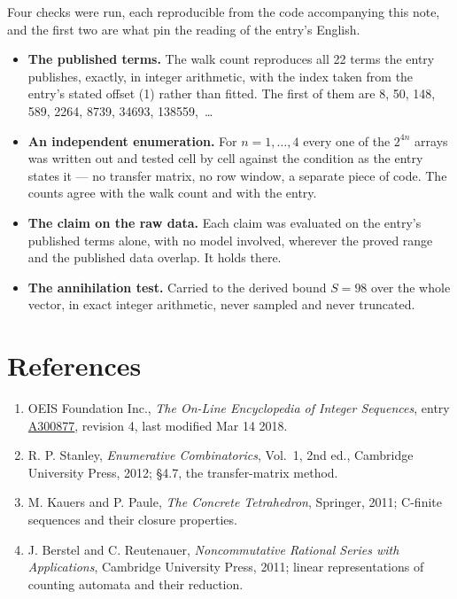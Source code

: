 \documentclass[11pt]{article}
\theoremstyle{definition}
\begin{document}
Four checks were run, each reproducible from the code accompanying this note, and the first two are what pin the reading of the entry's English.

\begin{itemize}

\item {\bfseries The published terms.} The walk count reproduces all 22 terms the entry publishes, exactly, in integer arithmetic, with the index taken from the entry's stated offset (1) rather than fitted. The first of them are 8, 50, 148, 589, 2264, 8739, 34693, 138559,~\dots

\item {\bfseries An independent enumeration.} For $n = 1,\dots,4$ every one of the $2^{4n}$ arrays was written out and tested cell by cell against the condition as the entry states it --- no transfer matrix, no row window, a separate piece of code. The counts agree with the walk count and with the entry.

\item {\bfseries The claim on the raw data.} Each claim was evaluated on the entry's published terms alone, with no model involved, wherever the proved range and the published data overlap. It holds there.

\item {\bfseries The annihilation test.} Carried to the derived bound $S = 98$ over the whole vector, in exact integer arithmetic, never sampled and never truncated.

\end{itemize}

\section{References}

\begin{enumerate}

\item OEIS Foundation Inc., \emph{The On-Line Encyclopedia of Integer Sequences}, entry \href{https://oeis.org/A300877}{A300877}, revision 4, last modified Mar 14 2018.

\item R. P. Stanley, \emph{Enumerative Combinatorics}, Vol.~1, 2nd ed., Cambridge University Press, 2012; \S4.7, the transfer-matrix method.

\item M. Kauers and P. Paule, \emph{The Concrete Tetrahedron}, Springer, 2011; C-finite sequences and their closure properties.

\item J. Berstel and C. Reutenauer, \emph{Noncommutative Rational Series with Applications}, Cambridge University Press, 2011; linear representations of counting automata and their reduction.

\end{enumerate}
\end{document}
